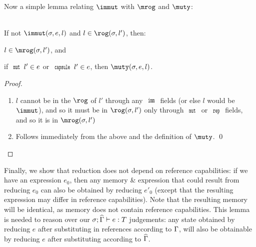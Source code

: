 Now a simple lemma relating $\immut$ with $\mrog$ and $\muty$:

\SS\begin{Lemma}\ \\
	\indent If not $\immut(\s,e,l)$ and $l\in\rog(\s,l')$, then:
	\begin{ienumerate}
		\item $l\in\mrog(\s,l')$, and
		\item if $\Kw{mut}\,l'\in e$ or $\Kw{capsule}\,l'\in e$, then $\muty(\s,e,l)$.
	\end{ienumerate}
\end{Lemma}
\SS\begin{proof}
	\SS\begin{enumerate}
		\item $l$ cannot be in the $\rog$ of $l'$ through any $\Kw{imm}$ fields (or else $l$ would be $\immut$), and so it must be in $\rog(\s,l')$ only through $\Kw{mut}$ or $\Kw{rep}$ fields, and so it is in $\mrog(\s,l')$
		\item Follows immediately from the above and the definition of $\muty$.
	\qed\end{enumerate}
\end{proof}

Finally, we show that reduction does not depend on reference capabilities:
if we have an expression $e_0$, then any memory \& expression that could result from reducing $e_0$ 
can also be obtained by reducing $e'_0$ (except that the resulting expression may differ in reference capabilities).
Note that the resulting memory will be identical, as memory does not contain reference capabilities.
This lemma is needed to reason over our $\ty[\s][\demut{\G}]{e}{T}$ judgements: any state obtained by reducing $e$ after substituting in references according to $\Gamma$, will also be obtainable by reducing $e$ after substituting according to $\widehat{\Gamma}$.


